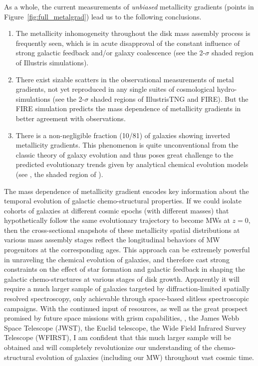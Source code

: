 As a whole, the current measurements of \emph{unbiased} metallicity gradients (points in Figure~\ref{fig:full_metalgrad}) lead us to the following conclusions.
\begin{enumerate}
    \item The metallicity inhomogeneity throughout the disk mass assembly process is frequently seen, which is
    in acute disapproval of the constant influence of strong galactic feedback and/or galaxy coalescence
    (see the 2-$\sigma$ shaded region of Illustris simulations).
    \item There exist sizable scatters in the observational measurements of metal gradients, not yet reproduced
    in any single suites of cosmological hydro-simulations (see the 2-$\sigma$ shaded regions of IllustrisTNG and
    FIRE). But the FIRE simulation predicts the mass dependence of metallicity gradients in better agreement with
    observations.
    \item There is a non-negligible fraction (10/81) of galaxies showing inverted metallicity gradients. This
    phenomenon is quite unconventional from the classic theory of galaxy evolution and thus poses great
    challenge to the predicted evolutionary trends given by analytical chemical evolution models (see \eg, the
    shaded region of \citet{Molla:2005eq}).
\end{enumerate}

The mass dependence of metallicity gradient encodes key information about the temporal evolution of galactic
chemo-structural properties.
If we could isolate cohorts of galaxies at different cosmic epochs (\ie with different masses) that 
hypothetically follow the same evolutionary trajectory to become MWs at $z=0$,
then the cross-sectional snapshots of these metallicity spatial distributions at various mass assembly stages
reflect the longitudinal behaviors of MW progenitors at the corresponding ages.
This approach can be extremely powerful in unraveling the chemical evolution of galaxies, and therefore cast 
strong constraints on the effect of star formation and galactic feedback in shaping the galactic chemo-structures
at various stages of disk growth.
Apparently it will require a much larger sample of galaxies targeted by diffraction-limited spatially resolved
spectroscopy, only achievable through space-based slitless spectroscopic campaigns.
With the continued input of \hst resources, as well as the great prospect promised by future space missions with
grism capabilities, \eg, the James Webb Space Telescope (JWST), the Euclid telescope, the Wide Field Infrared
Survey Telescope (WFIRST), I am confident that this much larger
sample will be obtained and will completely revolutionize our understanding of the chemo-structural evolution of 
galaxies (including our MW) throughout vast cosmic time.

